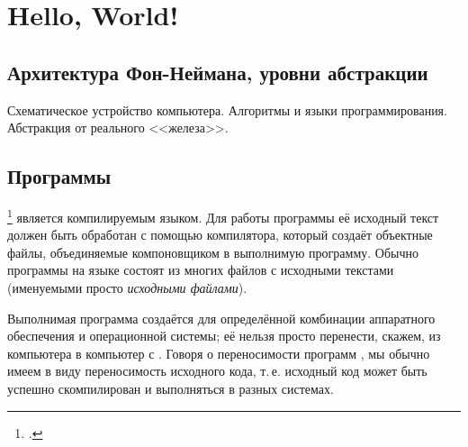 
\chapter{Hello, World!}\label{chap:helloworld}

\section{Архитектура Фон-Неймана, уровни абстракции}
Схематическое устройство компьютера. Алгоритмы и языки программирования. Абстракция от реального <<железа>>.



\section{Программы}
\footcite{Stroustrup:2019:ru} является компилируемым языком. Для работы программы её исходный текст должен быть обработан с помощью компилятора, который создаёт объектные файлы, объединяемые компоновщиком в выполнимую программу. Обычно программы на языке  состоят из многих файлов с исходными текстами (именуемыми просто \textit{исходными файлами}).

\begin{center}\end{center}

Выполнимая программа создаётся для определённой комбинации аппаратного обеспечения и операционной системы; её нельзя просто перенести, скажем, из компьютера  в компьютер с . Говоря о переносимости программ , мы обычно имеем в виду переносимость исходного кода, т.\,е. исходный код может быть успешно скомпилирован и выполняться в разных
системах.

